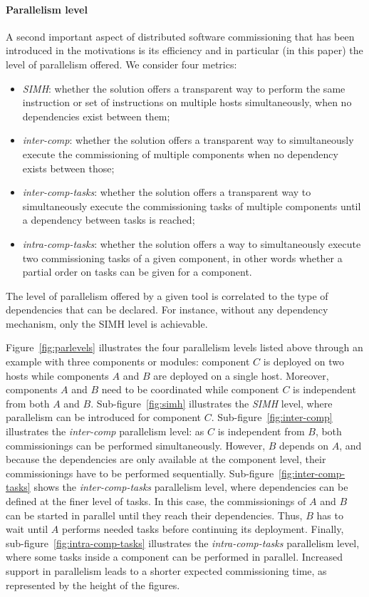 \paragraph{Parallelism level}
A second important aspect of distributed software commissioning that
has been introduced in the motivations is its efficiency and in
particular (in this paper) the level of parallelism offered. We
consider four metrics:
\begin{itemize}
\item \emph{SIMH}: whether the solution offers a transparent way to
  perform the same instruction or set of instructions on multiple
  hosts simultaneously, when no dependencies exist between them;
\item \emph{inter-comp}: whether the solution offers a transparent way
  to simultaneously execute the commissioning of multiple components
  when no dependency exists between those;
\item \emph{inter-comp-tasks}: whether the solution offers a
  transparent way to simultaneously execute the commissioning tasks of
  multiple components until a dependency between tasks is reached;
\item \emph{intra-comp-tasks}: whether the solution offers a way to
  simultaneously execute two commissioning tasks of a given component,
  in other words whether a partial order on tasks can be given for a
  component.
\end{itemize}
The level of parallelism offered by a given tool is correlated to the
type of dependencies that can be declared. For instance, without any
dependency mechanism, only the SIMH level is achievable.%

Figure~\ref{fig:parlevels} illustrates the four parallelism levels
listed above through an example with three components or modules:
component $C$ is deployed on two hosts while components $A$ and $B$
are deployed on a single host. Moreover, components $A$ and $B$ need
to be coordinated while component $C$ is independent from both $A$ and
$B$. Sub-figure~\ref{fig:simh} illustrates the \emph{SIMH} level,
where parallelism can be introduced for component
$C$. Sub-figure~\ref{fig:inter-comp} illustrates the \emph{inter-comp}
parallelism level: as $C$ is independent from $B$, both commissionings
can be performed simultaneously. However, $B$ depends on $A$, and
because the dependencies are only available at the component level,
their commissionings have to be performed
sequentially. Sub-figure~\ref{fig:inter-comp-tasks} shows the
\emph{inter-comp-tasks} parallelism level, where dependencies can be
defined at the finer level of tasks. In this case, the commissionings
of $A$ and $B$ can be started in parallel until they reach their
dependencies. Thus, $B$ has to wait until $A$ performs needed tasks
before continuing its deployment. Finally,
sub-figure~\ref{fig:intra-comp-tasks} illustrates the
\emph{intra-comp-tasks} parallelism level, where some tasks inside a
component can be performed in parallel. Increased support in
parallelism leads to a shorter expected commissioning time, as
represented by the height of the figures.


